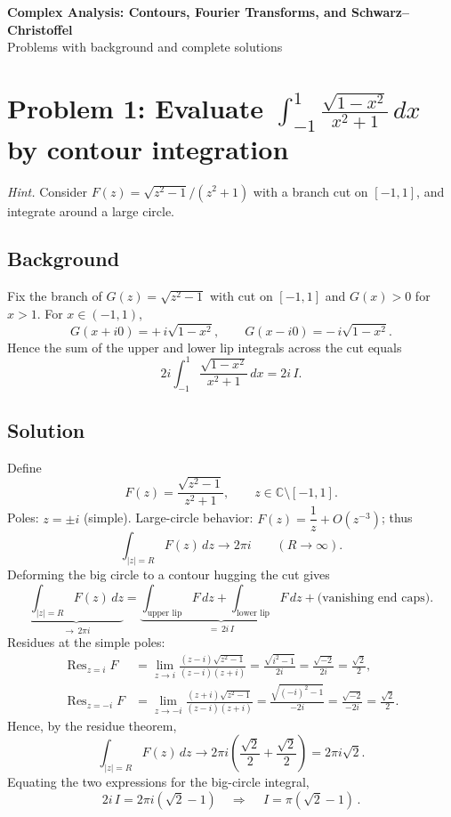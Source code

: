 \documentclass[11pt]{article}
\DeclareMathOperator{\Res}{Res}
\begin{document}
	
	\begin{center}
		{\Large\bf Complex Analysis: Contours, Fourier Transforms, and Schwarz--Christoffel}\\[0.45em]
		{\small Problems with background and complete solutions}
	\end{center}
	
	\bigskip
	
	\section{Problem 1: Evaluate \(\displaystyle \int_{-1}^{1}\frac{\sqrt{1-x^{2}}}{x^{2}+1}\,dx\) by contour integration}
	
	\textit{Hint.} Consider \(F(z)=\sqrt{z^{2}-1}/(z^{2}+1)\) with a branch cut on \([-1,1]\), and integrate around a large circle.
	
	\subsection*{Background}
	Fix the branch of \(G(z)=\sqrt{z^{2}-1}\) with cut on \([-1,1]\) and \(G(x)>0\) for \(x>1\).
	For \(x\in(-1,1)\),
	\[
	G(x+i0)=+\,i\sqrt{1-x^{2}},\qquad G(x-i0)=-\,i\sqrt{1-x^{2}}.
	\]
	Hence the sum of the upper and lower lip integrals across the cut equals
	\[
	2i\int_{-1}^{1}\frac{\sqrt{1-x^{2}}}{x^{2}+1}\,dx = 2i\,I.
	\]
	
	\subsection*{Solution}
	Define
	\[
	F(z)=\frac{\sqrt{z^{2}-1}}{z^{2}+1},\qquad z\in\mathbb C\setminus[-1,1].
	\]
	Poles: \(z=\pm i\) (simple). Large-circle behavior: \(F(z)=\dfrac{1}{z}+O(z^{-3})\); thus
	\[
	\int_{|z|=R}F(z)\,dz \longrightarrow 2\pi i \qquad (R\to\infty).
	\]
	Deforming the big circle to a contour hugging the cut gives
	\[
	\underbrace{\int_{|z|=R}F(z)\,dz}_{\to\,2\pi i}
	=
	\underbrace{\int_{\text{upper lip}}F\,dz+\int_{\text{lower lip}}F\,dz}_{=\,2i\,I}
	+\text{(vanishing end caps)}.
	\]
	Residues at the simple poles:
	\begin{align*}
		\Res_{z=i}F
		&=\lim_{z\to i}\frac{(z-i)\sqrt{z^{2}-1}}{(z-i)(z+i)}
		=\frac{\sqrt{i^{2}-1}}{2i}
		=\frac{\sqrt{-2}}{2i}
		=\frac{\sqrt2}{2},\\
		\Res_{z=-i}F
		&=\lim_{z\to -i}\frac{(z+i)\sqrt{z^{2}-1}}{(z-i)(z+i)}
		=\frac{\sqrt{(-i)^{2}-1}}{-2i}
		=\frac{\sqrt{-2}}{-2i}
		=\frac{\sqrt2}{2}.
	\end{align*}
	Hence, by the residue theorem,
	\[
	\int_{|z|=R}F(z)\,dz \longrightarrow 2\pi i\left(\frac{\sqrt2}{2}+\frac{\sqrt2}{2}\right)=2\pi i\sqrt2.
	\]
	Equating the two expressions for the big-circle integral,
	\[
	2i\,I=2\pi i(\sqrt2-1)\quad\Rightarrow\quad
	\boxed{\,I=\pi(\sqrt2-1)\, }.
	\]
	
\end{document}
